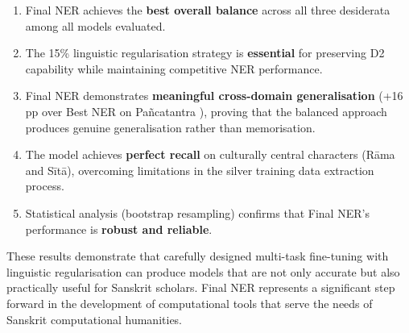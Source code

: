\begin{enumerate}
    \item Final NER achieves the \textbf{best overall balance} across all three desiderata among all models evaluated.
    \item The 15\% linguistic regularisation strategy is \textbf{essential} for preserving D2 capability while maintaining competitive NER performance.
    \item Final NER demonstrates \textbf{meaningful cross-domain generalisation} (+16 pp over Best NER on Pañcatantra \cite{pancatantra_text}), proving that the balanced approach produces genuine generalisation rather than memorisation.
    \item The model achieves \textbf{perfect recall} on culturally central characters (Rāma and Sītā), overcoming limitations in the silver training data extraction process.
    \item Statistical analysis (bootstrap resampling) confirms that Final NER's performance is \textbf{robust and reliable}.
\end{enumerate}

These results demonstrate that carefully designed multi-task fine-tuning with linguistic regularisation can produce models that are not only accurate but also practically useful for Sanskrit scholars. Final NER represents a significant step forward in the development of computational tools that serve the needs of Sanskrit computational humanities.

